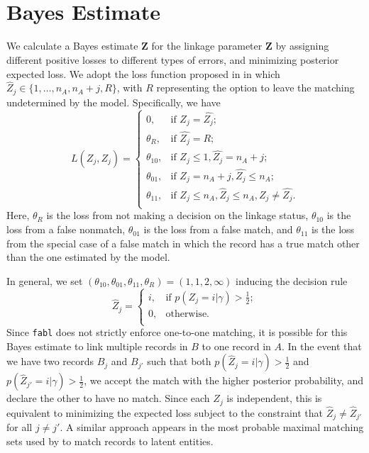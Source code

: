 \documentclass[ba]{imsart}
\begin{document}
\hypertarget{bayes-estimate}{%
		\section{Bayes Estimate}
		\label{bayes-estimate}}
	
We calculate a Bayes estimate $\hat{\bm{Z}}$ for the linkage parameter $\bm{Z}$ by assigning different positive losses to different types of errors, and minimizing posterior expected loss. We adopt the loss function proposed in \cite{sadinle_bayesian_2017} in which $\hat{Z}_j \in \{1, \ldots, n_A, n_A + j, R\}$, with $R$ representing the option to leave the matching undetermined by the model. Specifically, we have
	\[L(\hat{Z_j}, Z_j)=\begin{cases} 
		0,  & \text{if } Z_j = \hat{Z_j}; \\
		\theta_R,  & \text{if } \hat{Z_j} = R; \\
		\theta_{10},  & \text{if } Z_j \leq 1,\hat{Z_j} = n_A + j ; \\
		\theta_{01},  & \text{if } Z_j = n_A + j,\hat{Z_j} \leq n_A ; \\
		\theta_{11},  & \text{if } Z_j \leq n_A, \hat{Z}_j \leq n_A, Z_j \neq \hat{Z_j}. \\
	\end{cases}\] 
Here, $\theta_R$ is the loss from not making a decision on the linkage status, $\theta_{10}$ is the loss from a false nonmatch, $\theta_{01}$ is the loss from a false match, and $\theta_{11}$ is the loss from the special case of a false match in which the record has a true match other than the one estimated by the model. 

In general, we set $(\theta_{10}, \theta_{01}, \theta_{11}, \theta_R) = (1, 1, 2, \infty)$ inducing the decision rule
	$$\hat{Z}_j =\begin{cases} 
		i,  & \text{if } p(Z_j = i |\gamma) > \frac{1}{2}; \\
		0,  & \text{otherwise}. \\
	\end{cases}$$
Since \texttt{fabl} does not strictly enforce one-to-one matching, it is possible for this Bayes estimate to link multiple records in $B$ to one record in $A$. In the event that we have two records $B_j$ and $B_{j'}$ such that both $p(\hat{Z}_j = i |\gamma) > \frac{1}{2}$ and $ p(\hat{Z}_{j'} = i |\gamma) > \frac{1}{2}$, we accept the match with the higher posterior probability, and declare the other to have no match. Since each $Z_j$ is independent, this is equivalent to minimizing the expected loss subject to the constraint that $\hat{Z}_j \neq \hat{Z}_{j'}$ for all $j \neq j'$.  A similar approach appears in the most probable maximal matching sets used by \cite{steorts_bayesian_2016} to match records to latent entities.
\end{document}
